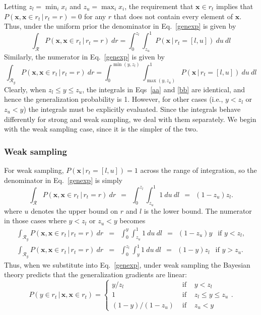 \documentclass[doc]{apa6}
\newcommand{\p}{P}
\newcommand{\xn}{{\bm{x}}}
\newcommand{\rt}{{r_t}}
\newcommand{\condon}{\, | \,}
\begin{document}
Letting $z_l = \min_i x_i$ and $z_u = \max_i x_i$, the requirement that $\xn \in \rt$ implies that $\p(\xn, \xn \in \rt\condon  \rt=r)=0$ for any $r$ that does not contain every element of $\xn$. Thus, under the uniform prior the denominator in Eq.~\ref{genexp} is given by
\begin{equation}
\int_{\mathcal{R}} \p(\xn, \xn \in \rt \condon  \rt=r) \ dr = \int_0^{z_l} \int_{z_u}^1 \p(\xn \condon  \rt = [l,u]) \ du \ dl \label{aa}
\end{equation}
Similarly, the numerator in Eq.~\ref{genexp} is given by
\begin{equation}
\int_{\mathcal{R}_y} \p(\xn, \xn \in \rt \condon  \rt=r) \ dr = \int_0^{\min(y,z_l)} \int_{\max(y,z_u)}^1 \p(\xn \condon  \rt = [l,u]) \ du \ dl \label{bb}
\end{equation}
Clearly, when $z_l \leq y \leq z_u$, the integrals in Eqs~\ref{aa} and \ref{bb} are identical, and hence the generalization probability is 1. However, for other cases (i.e., $y<z_l$ or $z_u<y$) the integrals must be explicitly evaluated. Since the integrals behave differently for strong and weak sampling, we deal with them separately. We begin with the weak sampling case, since it is the simpler of the two.

\subsubsection{Weak sampling} For weak sampling, $\p(\xn \condon  \rt =[l,u])=1$ across the range of integration, so the denominator in Eq.~\ref{genexp} is simply
\begin{equation}
\int_{\mathcal{R}} \p(\xn, \xn \in \rt \condon  \rt=r) \ dr \ \ = \ \ \int_0^{z_l} \int_{z_u}^1 1 \ du \ dl \ \ = \ \ (1-z_u)z_l.
\end{equation}
where $u$ denotes the upper bound on $r$ and $l$ is the lower bound. The numerator in those cases where $y<z_l$ or $z_u<y$ becomes
\begin{eqnarray}
\int_{\mathcal{R}_y} \p(\xn, \xn \in \rt \condon  \rt=r) \ dr &=& \int_0^{y} \int_{z_u}^1 1 \ du \ dl \ \ = \ \ (1-z_u)y \ \ \mbox{ if } y<z_l, \\
\int_{\mathcal{R}_y} \p(\xn, \xn \in \rt \condon  \rt=r) \ dr &=& \int_0^{z_l} \int_{y}^1 1 \ du \ dl \ \ = \ \ (1-y)z_l \ \ \mbox{ if } y>z_u.
\end{eqnarray}
Thus, when we substitute into Eq.~\ref{genexp}, under weak sampling the Bayesian theory predicts that the generalization gradients are linear:
\begin{equation}
\p(y \in \rt \condon  \xn,  \xn \in \rt) = \left\{ \begin{array}{rcl} y/z_l & \mbox{ if } & y<z_l \\ 1 & \mbox{ if } & z_l \leq y \leq z_u \\ (1-y)/(1-z_u) & \mbox{ if } & z_u < y  \end{array} \right..
\end{equation}
\end{document}
